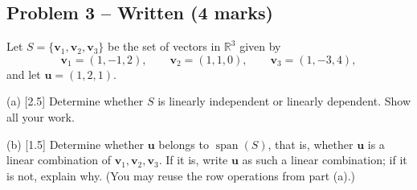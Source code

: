 \documentclass[11pt,a4paper]{article}
\begin{document}
\subsection*{Problem 3 -- Written (4 marks)}
Let $S=\{\mathbf{v}_1,\mathbf{v}_2,\mathbf{v}_3\}$ be the set of vectors in $\mathbb{R}^3$ given by\[\mathbf{v}_1=(1,-1,2),\qquad \mathbf{v}_2=(1,1,0),\qquad \mathbf{v}_3=(1,-3,4),\]and let $\mathbf{u}=(1,2,1)$.\par (a) [2.5] Determine whether $S$ is linearly independent or linearly dependent. Show all your work.\par (b) [1.5] Determine whether $\mathbf{u}$ belongs to $\operatorname{span}(S)$, that is, whether $\mathbf{u}$ is a linear combination of $\mathbf{v}_1,\mathbf{v}_2,\mathbf{v}_3$. If it is, write $\mathbf{u}$ as such a linear combination; if it is not, explain why. (You may reuse the row operations from part (a).)\par
\end{document}

